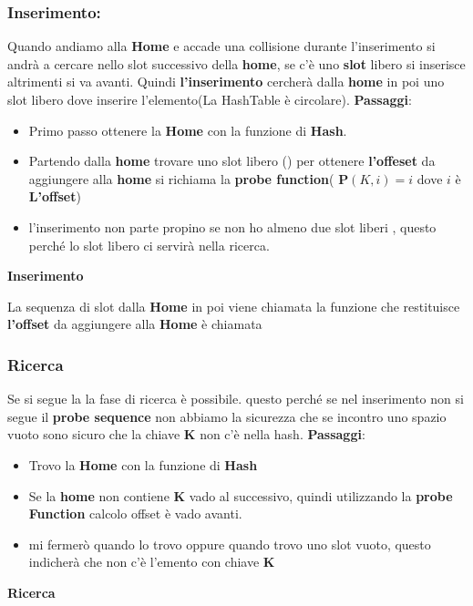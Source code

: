 \subsubsection{Inserimento:}
Quando andiamo alla \textbf{Home} e accade una collisione durante l'inserimento si andrà a cercare nello slot successivo della \textbf{home}, se c'è uno \textbf{slot} libero si inserisce altrimenti si va avanti. Quindi \textbf{l'inserimento} cercherà dalla \textbf{home} in poi uno slot libero dove inserire l'elemento(La HashTable è circolare).\newline\newline
\textbf{Passaggi}:
\begin{itemize}
    \item Primo passo ottenere la \textbf{Home} con la funzione di \textbf{Hash}.
    \item Partendo dalla \textbf{home} trovare uno slot libero () per ottenere \textbf{l'offeset} da aggiungere alla \textbf{home} si richiama la \textbf{probe function}( \textbf{P}$(K, i) = i$ dove $i$ è \textbf{L'offset})
    \item l'inserimento non parte propino se non ho almeno due slot liberi , questo perché lo slot libero ci servirà nella ricerca.
\end{itemize}
\begin{tcolorbox}[width=15cm, boxsep=10pt]
     \textbf{Inserimento}
     
\end{tcolorbox}
La sequenza di slot dalla \textbf{Home} in poi viene chiamata  \textbf{\textcolor{blue}{}} la funzione che restituisce \textbf{l'offset} da aggiungere alla \textbf{Home} è chiamata \textbf{\textcolor{blue}{}}
\newpage
\subsubsection{Ricerca}
Se si segue la \textbf{\textcolor{blue}{}} la fase di ricerca è possibile. questo perché se nel inserimento non si  segue il \textbf{probe sequence} non abbiamo la sicurezza che se incontro uno spazio vuoto sono sicuro che la chiave \textbf{K} non c'è nella hash.\newline\newline
\textbf{Passaggi}:
\begin{itemize}
    \item Trovo la \textbf{Home} con la funzione di \textbf{Hash}
    \item Se la \textbf{home} non contiene \textbf{K} vado al successivo, quindi utilizzando la \textbf{probe Function} calcolo offset è vado avanti.
    \item mi fermerò quando lo trovo oppure quando trovo uno slot vuoto, questo indicherà che non c'è l'emento con chiave \textbf{K}
\end{itemize}
\begin{tcolorbox}[width=16cm, boxsep=10pt]
     \textbf{Ricerca}
     
\end{tcolorbox}
\newpage
